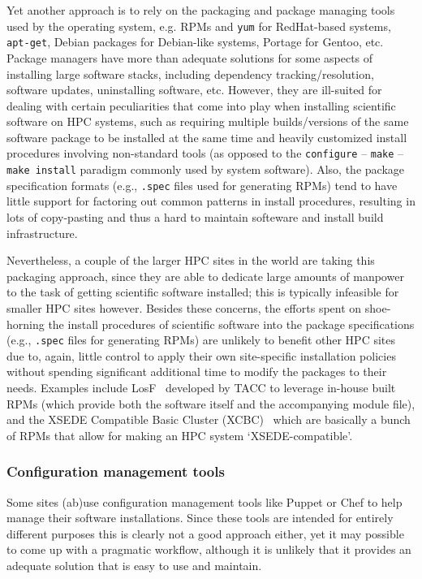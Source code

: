Yet another approach is to rely on the packaging and package managing tools used
by the operating system, e.g. RPMs and \texttt{yum} for RedHat-based systems,
\texttt{apt-get}, Debian packages for Debian-like systems, Portage for Gentoo, etc.
Package managers have more than adequate solutions for some aspects of
installing large software stacks, including dependency tracking/resolution, software
updates, uninstalling software, etc. However, they are ill-suited for dealing with
certain peculiarities that come into play when installing scientific software on
HPC systems, such as requiring multiple builds/versions of the same software package
to be installed at the same time and heavily customized install procedures involving
non-standard tools (as opposed to the
\texttt{configure} -- \texttt{make} -- \texttt{make install} paradigm commonly used
by system software). Also, the package specification formats (e.g., \texttt{.spec}
files used for generating RPMs) tend to have little support for factoring out
common patterns in install procedures, resulting in lots of copy-pasting and thus
a hard to maintain softeware and install build infrastructure.

Nevertheless, a couple of the larger HPC sites in the world are taking this
packaging approach, since they are able to dedicate large amounts of manpower to
the task of getting scientific software installed; this is typically infeasible for
smaller HPC sites however. Besides these concerns, the efforts spent on
shoe-horning the install procedures of scientific software into the package
specifications (e.g., \texttt{.spec} files for generating RPMs) are unlikely to
benefit other HPC sites due to, again, little control to apply their own
site-specific installation policies without spending significant additional time to
modify the packages to their needs. Examples include LosF~\cite{lmodSC11} developed
by TACC to leverage in-house built RPMs (which provide both the software itself
and the accompanying module file), and the XSEDE Compatible Basic Cluster
(XCBC)~\cite{Fischer14} which are basically a bunch of RPMs that allow for making an
HPC system `XSEDE-compatible'.


\subsubsection{Configuration management tools}

Some sites (ab)use configuration management tools like Puppet or Chef to help manage
their software installations. Since these tools are intended for entirely different
purposes this is clearly not a good approach either, yet it may possible to come up
with a pragmatic workflow, although it is unlikely that it provides an adequate
solution that is easy to use and maintain.

